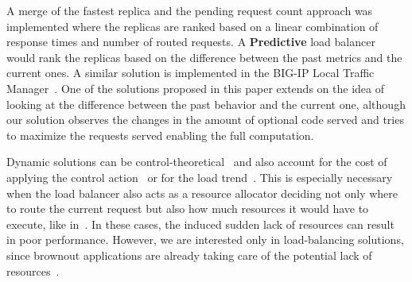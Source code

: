 A merge of the fastest replica and the pending request count approach
was implemented where the replicas are ranked based on a linear
combination of response times and number of routed requests. A
\textbf{Predictive} load balancer would rank the replicas based on the
difference between the past metrics and the current ones. A similar
solution is implemented in the BIG-IP Local Traffic
Manager~\cite{BIGIP}. One of the solutions proposed in this paper
extends on the idea of looking at the difference between the past
behavior and the current one, although our solution observes the
changes in the amount of optional code served and tries to maximize
the requests served enabling the full computation.

Dynamic solutions can be
control-theoretical~\cite{multipathctlb,comparisonstaticdynamic} and
also account for the cost of applying the control
action~\cite{costofcontrol} or for the load trend~\cite{CasolariSA}.
This is especially necessary when the load balancer also acts as a
resource allocator deciding not only where to route the current
request but also how much resources it would have to execute, like
in~\cite{Ardagnaalltogether}. In these cases, the induced sudden lack
of resources can result in poor performance. However, we are
interested only in load-balancing solutions, since brownout
applications are already taking care of the potential lack of
resources~\cite{cloudish-tr}.
